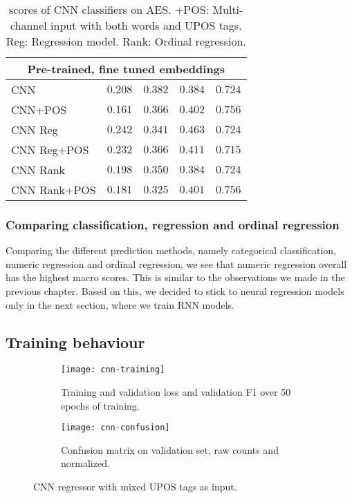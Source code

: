 \begin{table}
\begin{tabular}{lrrrr}
    \midrule
    \multicolumn{5}{c}{Pre-trained, fine tuned embeddings} \\
    \midrule
    CNN & $0.208$ & $0.382$ & $0.384$ & $0.724$ \\
    CNN+POS & $0.161$ & $0.366$ & $0.402$ & $\mathbf{0.756}$ \\
    CNN Reg & $0.242$ & $0.341$ & $\mathbf{0.463}$ & $0.724$ \\
    CNN Reg+POS & $0.232$ & $0.366$ & $0.411$ & $0.715$ \\
    CNN Rank & $0.198$ & $0.350$ & $0.384$ & $0.724$ \\
    CNN Rank+POS & $0.181$ & $0.325$ & $0.401$ & $\mathbf{0.756}$ \\
    \bottomrule
  \end{tabular}
  \caption[\FI scores of CNN classifiers on AES.]{
    \FI scores of CNN classifiers on AES. +POS: Multi-channel input with
    both words and UPOS tags. Reg: Regression model. Rank: Ordinal regression.
  }
  \label{tab:cnn-results}
\end{table}


\subsubsection{Comparing classification, regression and ordinal regression}

Comparing the different prediction methods, namely categorical
classification, numeric regression and ordinal regression, we see that
numeric regression overall has the highest macro \FI scores. This is similar
to the observations we made in the previous chapter. Based on this, we
decided to stick to neural regression models only in the next section, where
we train \ac{RNN} models.


\subsection{Training behaviour}

\begin{figure}
  \begin{subfigure}{\linewidth}
    \centering
    \texttt{[image: cnn-training]}
    \caption{
      Training and validation loss and validation F1 over 50 epochs of
      training.
    }
  \end{subfigure}
  \begin{subfigure}{\linewidth}
    \centering
    \texttt{[image: cnn-confusion]}
    \caption{
      Confusion matrix on validation set, raw counts and normalized.
    }
  \end{subfigure}
  \caption[Training behaviour of CNN regression]{
    CNN regressor with mixed UPOS tags as input.
  }
  \label{fig:cnn-training}
\end{figure}

